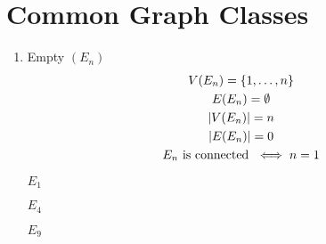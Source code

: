 \documentclass[letterpaper,12pt,fleqn]{article}
\begin{document}
\section*{Common Graph Classes}

\begin{enumerate}[left=0pt]

\item Empty \((E_n)\)
  \begin{gather*}
    V(E_n)=\{1,\ldots,n\} \\
    E(E_n)=\emptyset \\
    \lvert V(E_n)\rvert=n \\
    \lvert E(E_n)\rvert=0 \\
    E_n\ \text{is connected}\ \iff n=1
  \end{gather*}

  \begin{examples}
    \begin{minipage}{1.5in}
      \begin{center}

        \bigskip

        \(E_1\)
      \end{center}
    \end{minipage}
    \begin{minipage}{2.5in}
      \begin{center}

        \bigskip

        \(E_4\)
      \end{center}
    \end{minipage}
    \begin{minipage}{2in}
      \begin{center}

        \bigskip

        \(E_9\)
      \end{center}
    \end{minipage}
  \end{examples}


\end{enumerate}
\end{document}
